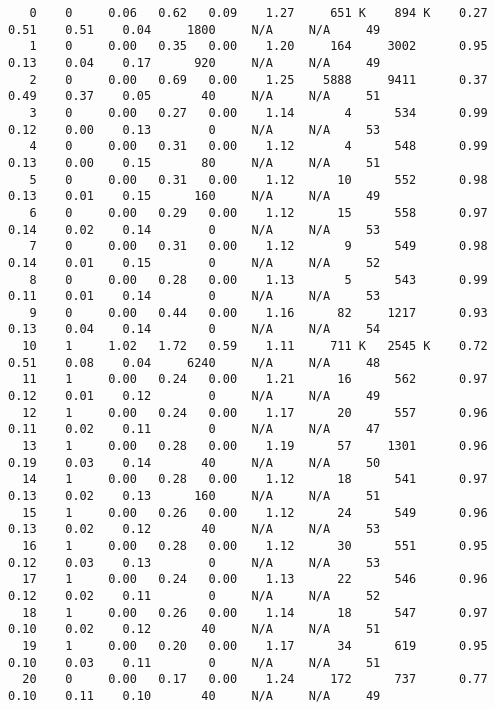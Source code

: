 \begin{lstlisting}
   0    0     0.06   0.62   0.09    1.27     651 K    894 K    0.27    0.51    0.51    0.04     1800     N/A     N/A     49
   1    0     0.00   0.35   0.00    1.20     164     3002      0.95    0.13    0.04    0.17      920     N/A     N/A     49
   2    0     0.00   0.69   0.00    1.25    5888     9411      0.37    0.49    0.37    0.05       40     N/A     N/A     51
   3    0     0.00   0.27   0.00    1.14       4      534      0.99    0.12    0.00    0.13        0     N/A     N/A     53
   4    0     0.00   0.31   0.00    1.12       4      548      0.99    0.13    0.00    0.15       80     N/A     N/A     51
   5    0     0.00   0.31   0.00    1.12      10      552      0.98    0.13    0.01    0.15      160     N/A     N/A     49
   6    0     0.00   0.29   0.00    1.12      15      558      0.97    0.14    0.02    0.14        0     N/A     N/A     53
   7    0     0.00   0.31   0.00    1.12       9      549      0.98    0.14    0.01    0.15        0     N/A     N/A     52
   8    0     0.00   0.28   0.00    1.13       5      543      0.99    0.11    0.01    0.14        0     N/A     N/A     53
   9    0     0.00   0.44   0.00    1.16      82     1217      0.93    0.13    0.04    0.14        0     N/A     N/A     54
  10    1     1.02   1.72   0.59    1.11     711 K   2545 K    0.72    0.51    0.08    0.04     6240     N/A     N/A     48
  11    1     0.00   0.24   0.00    1.21      16      562      0.97    0.12    0.01    0.12        0     N/A     N/A     49
  12    1     0.00   0.24   0.00    1.17      20      557      0.96    0.11    0.02    0.11        0     N/A     N/A     47
  13    1     0.00   0.28   0.00    1.19      57     1301      0.96    0.19    0.03    0.14       40     N/A     N/A     50
  14    1     0.00   0.28   0.00    1.12      18      541      0.97    0.13    0.02    0.13      160     N/A     N/A     51
  15    1     0.00   0.26   0.00    1.12      24      549      0.96    0.13    0.02    0.12       40     N/A     N/A     53
  16    1     0.00   0.28   0.00    1.12      30      551      0.95    0.12    0.03    0.13        0     N/A     N/A     53
  17    1     0.00   0.24   0.00    1.13      22      546      0.96    0.12    0.02    0.11        0     N/A     N/A     52
  18    1     0.00   0.26   0.00    1.14      18      547      0.97    0.10    0.02    0.12       40     N/A     N/A     51
  19    1     0.00   0.20   0.00    1.17      34      619      0.95    0.10    0.03    0.11        0     N/A     N/A     51
  20    0     0.00   0.17   0.00    1.24     172      737      0.77    0.10    0.11    0.10       40     N/A     N/A     49

\end{lstlisting}
